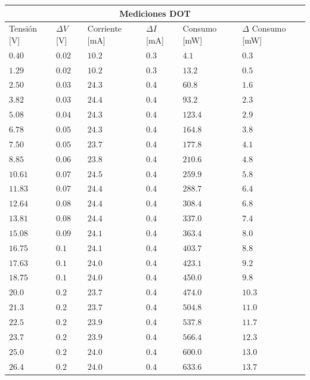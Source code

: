 \documentclass[12pt,a4paper]{article}
\begin{document}
				\begin{center}
			
			{\footnotesize \begin{tabular}{ |l|l|l|l|l|l| }

			\hline
				\multicolumn{6}{|c|}{\textbf{Mediciones DOT}}\\ \hline
				Tensión [V] & $\Delta V$ [V] & Corriente [mA] & $\Delta I$ [mA] & Consumo [mW] & $\Delta$ Consumo [mW]\\ \hline
				$0.40$ & $0.02$ & $10.2$ & $0.3$ & $4.1$ & $0.3$ \\ \hline
				$1.29$ & $0.02$ & $10.2$ & $0.3$ & $13.2$ & $0.5$ \\ \hline
				$2.50$ & $0.03$ & $24.3$ & $0.4$ & $60.8$ & $1.6$ \\ \hline
				$3.82$ & $0.03$ & $24.4$ & $0.4$ & $93.2$ & $2.3$ \\ \hline
				$5.08$ & $0.04$ & $24.3$ & $0.4$ & $123.4$ & $2.9$ \\ \hline
				$6.78$ & $0.05$ & $24.3$ & $0.4$ & $164.8$ & $3.8$ \\ \hline
				$7.50$ & $0.05$ & $23.7$ & $0.4$ & $177.8$ & $4.1$ \\ \hline
				$8.85$ & $0.06$ & $23.8$ & $0.4$ & $210.6$ & $4.8$ \\ \hline
				$10.61$ & $0.07$ & $24.5$ & $0.4$ & $259.9$ & $5.8$ \\ \hline
				$11.83$ & $0.07$ & $24.4$ & $0.4$ & $288.7$ & $6.4$ \\ \hline
				$12.64$ & $0.08$ & $24.4$ & $0.4$ & $308.4$ & $6.8$ \\ \hline
				$13.81$ & $0.08$ & $24.4$ & $0.4$ & $337.0$ & $7.4$ \\ \hline
				$15.08$ & $0.09$ & $24.1$ & $0.4$ & $363.4$ & $8.0$ \\ \hline
				$16.75$ & $0.1$ & $24.1$ & $0.4$ & $403.7$ & $8.8$ \\ \hline
				$17.63$ & $0.1$ & $24.0$ & $0.4$ & $423.1$ & $9.2$ \\ \hline
				$18.75$ & $0.1$ & $24.0$ & $0.4$ & $450.0$ & $9.8$ \\ \hline
				$20.0$ & $0.2$ & $23.7$ & $0.4$ & $474.0$ & $10.3$ \\ \hline
				$21.3$ & $0.2$ & $23.7$ & $0.4$ & $504.8$ & $11.0$ \\ \hline
				$22.5$ & $0.2$ & $23.9$ & $0.4$ & $537.8$ & $11.7$ \\ \hline
				$23.7$ & $0.2$ & $23.9$ & $0.4$ & $566.4$ & $12.3$ \\ \hline
				$25.0$ & $0.2$ & $24.0$ & $0.4$ & $600.0$ & $13.0$ \\ \hline
				$26.4$ & $0.2$ & $24.0$ & $0.4$ & $633.6$ & $13.7$ \\ \hline
 				
				
			\end{tabular}}\label{tab:consumodot}
			\end{center}
\end{document}
